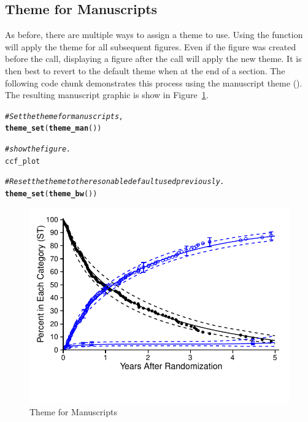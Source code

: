 \documentclass[nojss]{jss}\usepackage[]{graphicx}\usepackage[]{color}
\makeatletter
\def\maxwidth{ %
  \ifdim\Gin@nat@width>\linewidth
    \linewidth
  \else
    \Gin@nat@width
  \fi
}
\newcommand{\hlcom}[1]{\textcolor[rgb]{0.678,0.584,0.686}{\textit{#1}}}%
\newcommand{\hlstd}[1]{\textcolor[rgb]{0.345,0.345,0.345}{#1}}%
\newcommand{\hlkwd}[1]{\textcolor[rgb]{0.737,0.353,0.396}{\textbf{#1}}}%
\newenvironment{kframe}{%
 \def\at@end@of@kframe{}%
 \ifinner\ifhmode%
  \def\at@end@of@kframe{\end{minipage}}%
  \begin{minipage}{\columnwidth}%
 \fi\fi%
 \def\FrameCommand##1{\hskip\@totalleftmargin \hskip-\fboxsep
 \colorbox{shadecolor}{##1}\hskip-\fboxsep
     \hskip-\linewidth \hskip-\@totalleftmargin \hskip\columnwidth}%
 \MakeFramed {\advance\hsize-\width
   \@totalleftmargin\z@ \linewidth\hsize
   \@setminipage}}%
 {\par\unskip\endMakeFramed%
 \at@end@of@kframe}
\newenvironment{knitrout}{}{} %
\makeatother
\begin{document}
\subsection{Theme for Manuscripts}\label{S:theme_man}

As before, there are multiple ways to assign a theme to use. Using the  function will apply the theme for all subsequent figures. Even if the figure was created before the  call, displaying a figure after the call will apply the new theme. It is then best to revert to the default theme when at the end of a section. The following code chunk demonstrates this process using the manuscript theme (). The resulting manuscript graphic is show in Figure~\ref{F:manuscriptTheme}.
\begin{knitrout}\footnotesize
{}\color{fgcolor}\begin{kframe}
\begin{alltt}
\hlcom{# Set the theme for manuscripts,}
\hlkwd{theme_set}\hlstd{(}\hlkwd{theme_man}\hlstd{())}

\hlcom{# show the figure.}
\hlstd{ccf_plot}

\hlcom{# Reset the theme to the resonable default used previously.}
\hlkwd{theme_set}\hlstd{(}\hlkwd{theme_bw}\hlstd{())}
\end{alltt}
\end{kframe}\begin{figure}[htpb]

{\centering \includegraphics[width=\maxwidth]{figure/beamer-manuscriptTheme-1} 

}

\caption[Theme for Manuscripts]{Theme for Manuscripts\label{F:manuscriptTheme}}
\end{figure}


\end{knitrout}
\end{document}
